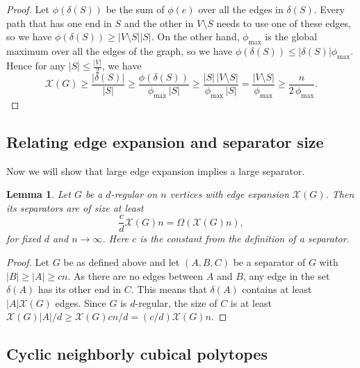 \documentclass[a4paper,12pt]{book}
\theoremstyle{plain}
\newtheorem{lemma}[theorem]{Lemma}
\theoremstyle{definition}
\begin{document}
\begin{proof}
Let $\phi(\delta(S))$ be the sum of $\phi(e)$ over all the edges in $\delta(S)$. Every path that has one end in $S$
and the other in $V\setminus S$ needs to use one of these edges, so we have $\phi(\delta(S)) \ge   |V\setminus S | |S |$.
On the other hand, $\phi_{\max}$ is the global maximum over all the edges of the graph, so we have $\phi(\delta(S)) \le  |\delta(S) |\phi_{\max}$.
Hence for any $|S| \le \frac{ |V |}{2}$, we have
\begin{equation}
\label{sepbound}
 \mathcal{X}(G) \ge \frac{|\delta(S)|}{|S|} 
                \ge \frac{\phi(\delta(S))}{\phi_{\max}\,|S|}
                \ge \frac{|S|\,|V{\setminus}S|}{\phi_{\max}\,|S|}
                 =  \frac{|V{\setminus}S|}{\phi_{\max}}
				\ge \frac{n}{2\,\phi_{\max}}.
\end{equation}
\end{proof} 
\subsection{Relating edge expansion and separator size}
Now we will show that large edge expansion implies a large separator.
\begin{lemma}
\label{separatorsize}
Let $G$ be a $d$-regular on $n$ vertices with edge expansion $\mathcal{X}(G)$.
Then its separators are of size at least
\begin{equation}
	\frac{c}{d}\mathcal{X}(G)n = \Omega(\mathcal{X}(G)n),
\end{equation}
for fixed $d$ and $n\rightarrow \infty$. Here $c$ is the constant from the definition of a separator.
\end{lemma}
\begin{proof}
Let $G$ be as defined above and let $(A,B,C)$ be a separator of $G$ with $|B| \ge |A| \ge cn$.
As there are no edges between $A$ and $B$, any edge in the set $\delta(A)$ has its other end in
$C$. This means that $\delta(A)$ contains at least $|A|\mathcal{X}(G)$ edges. Since $G$ is $d$-regular,
the size of $C$ is at least $\mathcal{X}(G)|A|/d \ge \mathcal{X}(G)cn/d = (c/d)\mathcal{X}(G)n$.  
\end{proof}

\subsection{Cyclic neighborly cubical polytopes}
\end{document}
